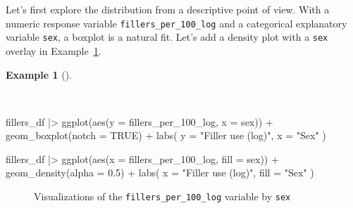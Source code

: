 \documentclass[
  letterpaper,
  DIV=11,
  numbers=noendperiod]{scrreprt}
\newenvironment{Shaded}{\begin{snugshade}}{\end{snugshade}}
\newcommand{\AttributeTok}[1]{\textcolor[rgb]{0.00,0.00,0.00}{#1}}
\newcommand{\ConstantTok}[1]{\textcolor[rgb]{0.00,0.00,0.00}{#1}}
\newcommand{\FloatTok}[1]{\textcolor[rgb]{0.00,0.00,0.00}{#1}}
\newcommand{\FunctionTok}[1]{\textcolor[rgb]{0.00,0.00,0.00}{#1}}
\newcommand{\NormalTok}[1]{\textcolor[rgb]{0.00,0.00,0.00}{#1}}
\newcommand{\SpecialCharTok}[1]{\textcolor[rgb]{0.00,0.00,0.00}{#1}}
\newcommand{\StringTok}[1]{\textcolor[rgb]{0.00,0.00,0.00}{#1}}
\theoremstyle{definition}
\newtheorem{example}{Example}[chapter]
\theoremstyle{remark}
\begin{document}
Let's first explore the distribution from a descriptive point of view.
With a numeric response variable \texttt{fillers\_per\_100\_log} and a
categorical explanatory variable \texttt{sex}, a boxplot is a natural
fit. Let's add a density plot with a \texttt{sex} overlay in
Example~\ref{exm-ida-num-bi-vis}.

\begin{example}[]\protect\hypertarget{exm-ida-num-bi-vis}{}\label{exm-ida-num-bi-vis}

~

\begin{Shaded}
\begin{Highlighting}[]
\NormalTok{fillers\_df }\SpecialCharTok{|\textgreater{}}
  \FunctionTok{ggplot}\NormalTok{(}\FunctionTok{aes}\NormalTok{(}\AttributeTok{y =}\NormalTok{ fillers\_per\_100\_log, }\AttributeTok{x =}\NormalTok{ sex)) }\SpecialCharTok{+}
  \FunctionTok{geom\_boxplot}\NormalTok{(}\AttributeTok{notch =} \ConstantTok{TRUE}\NormalTok{) }\SpecialCharTok{+}
  \FunctionTok{labs}\NormalTok{(}
    \AttributeTok{y =} \StringTok{"Filler use (log)"}\NormalTok{,}
    \AttributeTok{x =} \StringTok{"Sex"}
\NormalTok{  )}

\NormalTok{fillers\_df }\SpecialCharTok{|\textgreater{}}
  \FunctionTok{ggplot}\NormalTok{(}\FunctionTok{aes}\NormalTok{(}\AttributeTok{x =}\NormalTok{ fillers\_per\_100\_log, }\AttributeTok{fill =}\NormalTok{ sex)) }\SpecialCharTok{+}
  \FunctionTok{geom\_density}\NormalTok{(}\AttributeTok{alpha =} \FloatTok{0.5}\NormalTok{) }\SpecialCharTok{+}
  \FunctionTok{labs}\NormalTok{(}
    \AttributeTok{x =} \StringTok{"Filler use (log)"}\NormalTok{,}
    \AttributeTok{fill =} \StringTok{"Sex"}
\NormalTok{  )}
\end{Highlighting}
\end{Shaded}

\begin{figure}[H]

\begin{minipage}{0.50\linewidth}



\end{minipage}%
%
\begin{minipage}{0.50\linewidth}



\end{minipage}%

\caption{\label{fig-ida-num-bi-vis}Visualizations of the
\texttt{fillers\_per\_100\_log} variable by \texttt{sex}}

\end{figure}%

\end{example}
\end{document}

